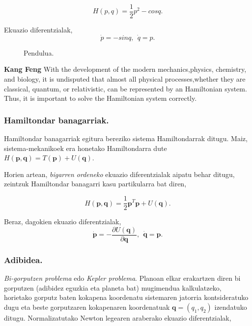 \begin{equation*}
H(p,q)=\frac{1}{2} p^2- cos q.
\end{equation*}

Ekuazio diferentzialak,
\begin{equation*}
\dot{p}= -sin q, \ \ \dot{q}=p.
\end{equation*}

\begin{figure}[h]
\centering
{}
\caption{ \small Pendulua.}
\label{fig:pendulua}
\end{figure}

\textbf{Kang Feng} With the development of the modern mechanics,physics, chemistry, and biology, it is undisputed that almost all physical processes,whether they are classical, quantum, or relativistic, can be represented by an Hamiltonian system. Thus, it is important to solve the Hamiltonian system correctly.

\subsubsection*{Hamiltondar banagarriak.}

Hamiltondar banagarriak egitura bereziko sistema Hamiltondarrak ditugu. Maiz, sistema-mekanikoek era honetako Hamiltondarra dute $H(\mathbf{p},\mathbf{q})=T(\mathbf{p})+U(\mathbf{q})$.

Horien artean, \emph{bigarren ordeneko} ekuazio diferentzialak aipatu behar ditugu, zeintzuk Hamiltondar banagarri kasu partikularra bat diren,  

\begin{equation*}
H(\mathbf{p},\mathbf{q})=\frac{1}{2}\mathbf{p}^T\mathbf{p} +U(\mathbf{q}).
\end{equation*}

Beraz, dagokien ekuazio diferentzialak,
\begin{equation*}
\dot{\mathbf{p}}=-\frac{\partial U(\mathbf{q})}{\partial \mathbf{q}}, \ \ \dot{\mathbf{q}}=\mathbf{p}. 
\end{equation*}

\subsubsection*{Adibidea.}
\emph{Bi-gorputzen problema} edo \emph{Kepler problema}. Planoan elkar erakartzen diren bi gorputzen (adibidez eguzkia eta planeta bat) mugimendua kalkulatzeko, horietako gorputz baten kokapena koordenatu sistemaren jatorria kontsideratuko dugu eta beste gorputzaren kokapenaren koordenatuak $\mathbf{q}=(q_1,q_2)$ izendatuko ditugu. Normalizatutako Newton legearen araberako ekuazio diferentzialak,  

